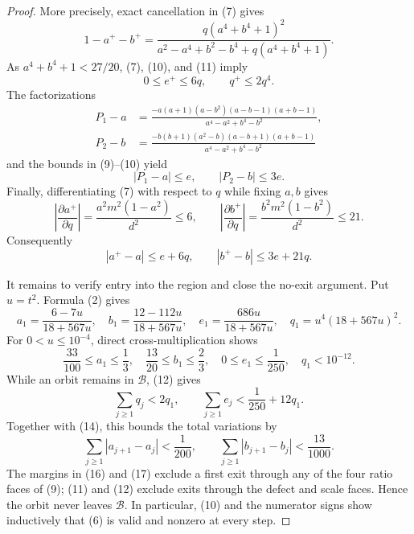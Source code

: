 \documentclass[11pt]{article}
\begin{document}
\begin{proof}
More precisely, exact cancellation in (7) gives
\begin{equation}
 1-a^+-b^+
 =\frac{q(a^4+b^4+1)^2}
 {a^2-a^4+b^2-b^4+q(a^4+b^4+1)}.
\end{equation}
As $a^4+b^4+1<27/20$, (7), (10), and (11) imply
\begin{equation}
 0\leq e^+\leq6q,\qquad q^+\leq2q^4.
\end{equation}
The factorizations
\begin{align*}
 P_1-a&=\frac{-a(a+1)(a-b^2)(a-b-1)(a+b-1)}
                   {a^4-a^2+b^4-b^2},\\
 P_2-b&=\frac{-b(b+1)(a^2-b)(a-b+1)(a+b-1)}
                   {a^4-a^2+b^4-b^2}
\end{align*}
and the bounds in (9)--(10) yield
\begin{equation}
 |P_1-a|\leq e,\qquad |P_2-b|\leq3e.
\end{equation}
Finally, differentiating (7) with respect to $q$ while fixing $a,b$ gives
\[
 \left|\frac{\partial a^+}{\partial q}\right|
 =\frac{a^2m^2(1-a^2)}{d^2}\leq6,\qquad
 \left|\frac{\partial b^+}{\partial q}\right|
 =\frac{b^2m^2(1-b^2)}{d^2}\leq21.
\]
Consequently
\begin{equation}
 |a^+-a|\leq e+6q,\qquad |b^+-b|\leq3e+21q.
\end{equation}

It remains to verify entry into the region and close the no-exit argument.
Put $u=t^2$.  Formula (2) gives
\begin{equation}
 a_1=\frac{6-7u}{18+567u},\quad
 b_1=\frac{12-112u}{18+567u},\quad
 e_1=\frac{686u}{18+567u},\quad
 q_1=u^4(18+567u)^2.
\end{equation}
For $0<u\leq10^{-4}$, direct cross-multiplication shows
\begin{equation}
 \frac{33}{100}\leq a_1\leq\frac13,\quad
 \frac{13}{20}\leq b_1\leq\frac23,\quad
 0\leq e_1\leq\frac1{250},\quad q_1<10^{-12}.
\end{equation}
While an orbit remains in $\mathcal B$, (12) gives
\[
 \sum_{j\geq1}q_j<2q_1,\qquad
 \sum_{j\geq1}e_j<\frac1{250}+12q_1.
\]
Together with (14), this bounds the total variations by
\begin{equation}
 \sum_{j\geq1}|a_{j+1}-a_j|<\frac1{200},\qquad
 \sum_{j\geq1}|b_{j+1}-b_j|<\frac{13}{1000}.
\end{equation}
The margins in (16) and (17) exclude a first exit through any of the four
ratio faces of (9); (11) and (12) exclude exits through the defect and scale
faces.  Hence the orbit never leaves $\mathcal B$.  In particular, (10) and
the numerator signs show inductively that (6) is valid and nonzero at every
step.


\end{proof}
\end{document}
